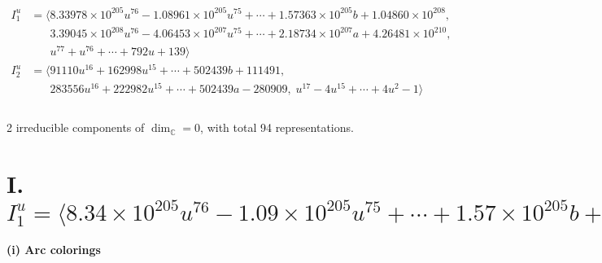 \documentclass[1p]{elsarticle_modified}
\theoremstyle{definition}
\begin{document}
\begin{align*}
I^u_{1}&=\langle 
8.33978\times10^{205} u^{76}-1.08961\times10^{205} u^{75}+\cdots+1.57363\times10^{205} b+1.04860\times10^{208},\\
\phantom{I^u_{1}}&\phantom{= \langle  }3.39045\times10^{208} u^{76}-4.06453\times10^{207} u^{75}+\cdots+2.18734\times10^{207} a+4.26481\times10^{210},\\
\phantom{I^u_{1}}&\phantom{= \langle  }u^{77}+u^{76}+\cdots+792 u+139\rangle \\
I^u_{2}&=\langle 
91110 u^{16}+162998 u^{15}+\cdots+502439 b+111491,\\
\phantom{I^u_{2}}&\phantom{= \langle  }283556 u^{16}+222982 u^{15}+\cdots+502439 a-280909,\;u^{17}-4 u^{15}+\cdots+4 u^2-1\rangle \\
\\
\end{align*}
\raggedright * 2 irreducible components of $\dim_{\mathbb{C}}=0$, with total 94 representations.\\
\newpage
\renewcommand{\arraystretch}{1}
\centering \section*{I. $I^u_{1}= \langle 8.34\times10^{205} u^{76}-1.09\times10^{205} u^{75}+\cdots+1.57\times10^{205} b+1.05\times10^{208},\;3.39\times10^{208} u^{76}-4.06\times10^{207} u^{75}+\cdots+2.19\times10^{207} a+4.26\times10^{210},\;u^{77}+u^{76}+\cdots+792 u+139 \rangle$}
\flushleft \textbf{(i) Arc colorings}\\
\end{document}
